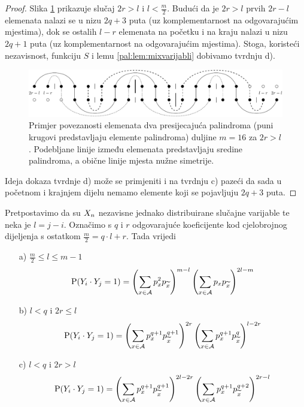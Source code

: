 \begin{proof}
\noindent
	Slika \ref{pal:fig:2r_vece_l} prikazuje
	slučaj $2r>l$ i $l<\frac{m}{2}$. Budući da je $2r>l$ prvih $2r-l$ elemenata
	nalazi se u nizu $2q+3$ puta (uz komplementarnost na odgovarajućim
	mjestima), dok se ostalih $l-r$ elemenata na početku i na kraju
	nalazi u nizu $2q+1$ puta (uz komplementarnost na odgovarajućim
	mjestima).
	Stoga, koristeći nezavisnost, funkciju $S$ i lemu \ref{pal:lem:mixvarijabli} dobivamo
	tvrdnju d).
%
\begin{figure}[htb!]
\centering%
\includegraphics[scale = 0.8]{poglavlja/palindromi/slike/2r_vece_l-crop.pdf}
\caption{Primjer povezanosti elemenata dva presijecajuća palindroma (puni krugovi
	predstavljaju elemente palindroma) duljine $m=16$ za $2r>l$. Podebljane
	linije između elemenata predstavljaju sredine palindroma, a obične linije
	mjesta nužne simetrije.}
\label{pal:fig:2r_vece_l}
\end{figure}


	Ideja dokaza tvrdnje d) može se primjeniti i na tvrdnju c)
	pazeći da sada u početnom i krajnjem dijelu nemamo
	elemente koji se pojavljuju $2q+3$ puta.
\end{proof}

\begin{kor} \label{pal:kor:njdvjerojatnostpresjeka}
	Pretpostavimo da su $\tsvar{X}_n$ nezavisne jednako distribuirane slučajne
	varijable
	te neka je $l = j-i$. Označimo s $q$ i $r$ odgovarajuće
	koeficijente kod cjelobrojnog dijeljenja s ostatkom
	$\frac{m}{2} = q \cdot l + r$. Tada vrijedi
	\begin{itemize}
		\item[a)]{
			 $\frac{m}{2} \leq l \leq m-1$
			\[
				\vP( \tsvar{Y}_i \cdot \tsvar{Y}_j =1 ) =
				\left(
					\sum_{x \in \mathcal{A}} p_x^2 p_{\ol{x}} 
				\right)^{m-l}
				\left(
					\sum_{x \in \mathcal{A}} p_x p_{\ol{x}} 
				\right)^{2l-m}
			\]
		}
		\item[b)]{
			 $l < q$ i $2r \leq l$
			\[
				\vP( \tsvar{Y}_i \cdot \tsvar{Y}_j =1 ) =
				\left(
				\sum_{x \in \mathcal{A}} p_x^{q+1} p_{\ol{x}}^{q+1} 
				\right)^{2r}
				\left(
				\sum_{x \in \mathcal{A}} p_x^{q+1} p_{\ol{x}}^{q} 
				\right)^{l-2r}
			\]
		}
		\item[c)]{
			 $l < q$ i $2r > l$
			\[
				\vP( \tsvar{Y}_i \cdot \tsvar{Y}_j =1 ) =
				\left(
				\sum_{x \in \mathcal{A}} p_x^{q+1} p_{\ol{x}}^{q+1} 
				\right)^{2l-2r}
				\left(
				\sum_{x \in \mathcal{A}} p_x^{q+1} p_{\ol{x}}^{q+2} 
				\right)^{2r-l}
			\]
		}
	\end{itemize}
\end{kor}

